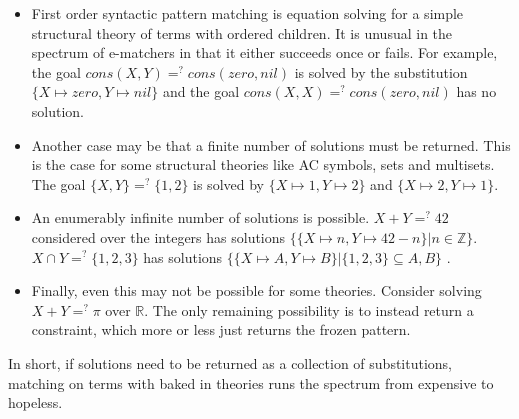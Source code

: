 \documentclass[sigconf]{acmart}
\begin{document}
\begin{itemize}

\item First order syntactic pattern matching is equation solving for a simple structural theory of terms with ordered children. It is unusual in the spectrum of e-matchers in that it either succeeds once or fails. For example, the goal $cons(X,Y) =^? cons(zero,nil) $ is solved by the substitution $\{X \mapsto zero, Y \mapsto nil\}$ and the goal $cons(X,X) =^? cons(zero,nil)$ has no solution.


\item Another case may be that a finite number of solutions must be returned. This is the case for some structural theories like AC symbols, sets and multisets. The goal $\{X , Y\} =^? \{1, 2\}$ is solved by $\{X \mapsto 1, Y \mapsto 2\}$ and $\{X \mapsto 2, Y \mapsto 1\}$. 



\item An enumerably infinite number of solutions is possible. $X + Y =^? 42$ considered over the integers has solutions $\{ \{X \mapsto n, Y \mapsto 42 - n  \} | n \in \mathbb{Z} \}$. $X \cap Y =^? \{1,2,3\}$ has solutions $\{ \{X \mapsto A, Y \mapsto B\} | \{1,2,3\} \subseteq A,B \} $ .





\item Finally, even this may not be possible for some theories. Consider solving $X + Y =^? \pi$ over $\mathbb{R}$. The only remaining possibility is to instead return a constraint, which more or less just returns the frozen pattern.

\end{itemize}
In short, if solutions need to be returned as a collection of substitutions, matching on terms with baked in theories runs the spectrum from expensive to hopeless.
\end{document}
